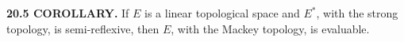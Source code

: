 \textbf{20.5 COROLLARY.}
If $E$ is a linear topological space and $E^*$, with the strong topology, is semi-reflexive, then $E$, with the Mackey topology, is evaluable.
